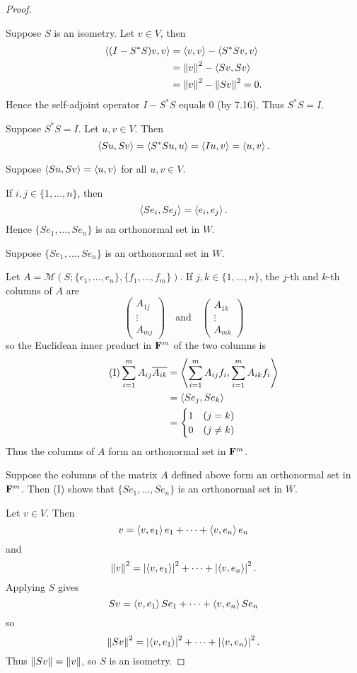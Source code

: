 \begin{proof} \

 Suppose $S$ is an isometry. Let $v\in V$, then
\begin{align*}
\left\langle(I-S^*S)v,v\right\rangle
&=\left\langle v,v\right\rangle-\left\langle S^*Sv,v\right\rangle\\
&=\norm{v}^2-\left\langle Sv,Sv\right\rangle\\
&=\norm{v}^2-\norm{Sv}^2=0.
\end{align*}
Hence the self-adjoint operator $I-S^*S$ equals $0$ (by 7.16). Thus $S^*S=I$.

 Suppose $S^*S=I$. Let $u,v\in V$. Then
\[\left\langle Su,Sv\right\rangle=\left\langle S^*Su,u\right\rangle=\left\langle Iu,v\right\rangle=\left\langle u,v\right\rangle.\]

 Suppose $\left\langle Su,Sv\right\rangle=\left\langle u,v\right\rangle$ for all $u,v\in V$. 

If $i,j\in\{1,\dots,n\}$, then
\[\left\langle Se_i,Se_j\right\rangle=\left\langle e_i,e_j\right\rangle.\]
Hence $\{Se_1,\dots,Se_n\}$ is an orthonormal set in $W$.

 Suppose $\{Se_1,\dots,Se_n\}$ is an orthonormal set in $W$.

Let $A=\mathcal{M}(S;\{e_1,\dots,e_n\},\{f_1,\dots,f_m\})$. If $j,k\in\{1,\dots,n\}$, the $j$-th and $k$-th columns of $A$ are 
\[\begin{pmatrix}
A_{1j}\\\vdots\\A_{mj}
\end{pmatrix}\quad\text{and}\quad
\begin{pmatrix}
A_{1k}\\\vdots\\A_{mk}
\end{pmatrix}\]
so the Euclidean inner product in $\mathbf F^m$ of the two columns is
\begin{align*}\tag{I}
\sum_{i=1}^{m}A_{ij}\overline{A_{ik}}
&=\left\langle\sum_{i=1}^{m}A_{ij}f_i,\sum_{i=1}^{m}A_{ik}f_i\right\rangle\\
&=\left\langle Se_j,Se_k\right\rangle\\
&=\begin{cases}
1&(j=k)\\
0&(j\neq k)
\end{cases}
\end{align*}
Thus the columns of $A$ form an orthonormal set in $\mathbf F^m$.

 Suppose the columns of the matrix $A$ defined above form an orthonormal set in $\mathbf F^m$. 
Then (I) shows that $\{Se_1,\dots,Se_n\}$ is an orthonormal set in $W$. 

Let $v\in V$. Then
\[v=\left\langle v,e_1\right\rangle e_1+\cdots+\left\langle v,e_n\right\rangle e_n\]
and
\[\norm{v}^2=\left|\left\langle v,e_1\right\rangle\right|^2+\cdots+\left|\left\langle v,e_n\right\rangle\right|^2.\]
Applying $S$ gives
\[Sv=\left\langle v,e_1\right\rangle Se_1+\cdots+\left\langle v,e_n\right\rangle Se_n\]
so
\[\norm{Sv}^2=\left|\left\langle v,e_1\right\rangle\right|^2+\cdots+\left|\left\langle v,e_n\right\rangle\right|^2.\]
Thus $\norm{Sv}=\norm{v}$, so $S$ is an isometry.
\end{proof}
\pagebreak

